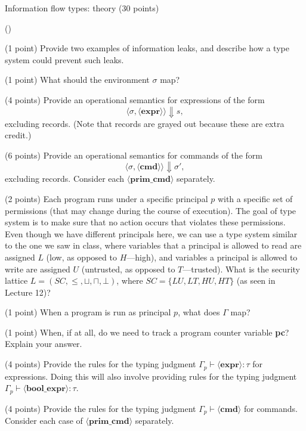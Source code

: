 \documentclass[11pt]{article}
\newcounter{partnumber}
\newenvironment{parts}{\begin{list}{
      (\alph{partnumber})}{
      \usecounter{partnumber} \setlength{\rightmargin}{\leftmargin}}
    \setlength{\itemsep}{.0 in}}{
  \end{list} \vspace*{.0 in}}
\begin{document}
\begin{problem}{Information flow types: theory (30 points)}
\begin{parts}
        \item (1 point) Provide two examples of information leaks, and describe how a type system could prevent such leaks.
        \item (1 point) What should the environment $\sigma$ map?
        \item (4 points) Provide an operational semantics for expressions of the form
\begin{equation*}
\langle \sigma, \langle \mathbf{expr} \rangle \rangle \Downarrow s,
\end{equation*}
excluding records. (Note that records are grayed out because these are extra credit.)
	\item (6 points) Provide an operational semantics for commands of the form
\begin{equation*}
\langle \sigma, \langle \mathbf{cmd} \rangle \rangle \Downarrow \sigma',
\end{equation*}
excluding records. Consider each $\langle \mathbf{prim\_cmd} \rangle$ separately.
        \item (2 points) Each program runs under a specific principal $p$ with a specific set of permissions (that may change during the course of execution).  The goal of type system is to make sure that no action occurs that violates these permissions. Even though we have different principals here, we can use a type system similar to the one we saw in class, where variables that a principal is allowed to read are assigned $L$ (low, as opposed to $H$---high), and variables a principal is allowed to write are assigned $U$ (untrusted, as opposed to $T$---trusted). What is the security lattice $L = (SC, \leq, \sqcup, \sqcap, \bot)$, where $SC = \{ LU, LT, HU, HT \}$ (as seen in Lecture 12)?
        \item (1 point) When a program is run as principal $p$, what does $\Gamma$ map?
        \item (1 point) When, if at all, do we need to track a program counter variable \textbf{pc}? Explain your answer.
        \item (4 points) Provide the rules for the typing judgment $\Gamma_p \vdash \langle \mathbf{expr} \rangle : \tau$ for expressions. Doing this will also involve providing rules for the typing judgment $\Gamma_p \vdash \langle \mathbf{bool\_expr} \rangle : \tau$.
        \item (4 points) Provide the rules for the typing judgment $\Gamma_p \vdash \langle \mathbf{cmd} \rangle$ for commands. Consider each case of $\langle \mathbf{prim\_cmd} \rangle$ separately.

\end{parts}
\end{problem}
\end{document}

